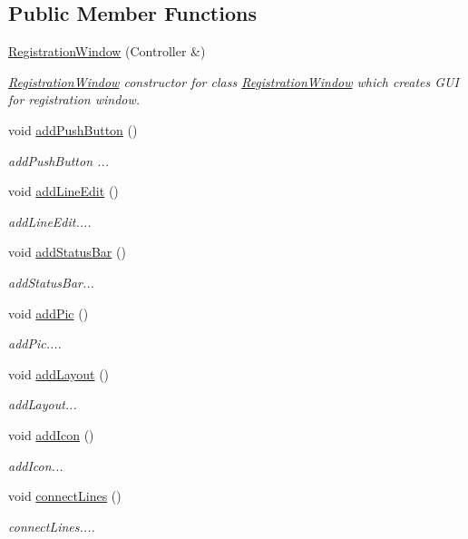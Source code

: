 \subsection*{Public Member Functions}
\begin{DoxyCompactItemize}
\item 
\hyperlink{classRegistrationWindow_ac8876ad29199208fc8b8bd25863c9318}{Registration\+Window} (Controller \&)
\begin{DoxyCompactList}\small\item\em \hyperlink{classRegistrationWindow}{Registration\+Window} constructor for class \hyperlink{classRegistrationWindow}{Registration\+Window} which creates G\+UI for registration window. \end{DoxyCompactList}\item 
void \hyperlink{classRegistrationWindow_a8ae5035dbe91465a32647f8c761ca0a2}{add\+Push\+Button} ()
\begin{DoxyCompactList}\small\item\em add\+Push\+Button ... \end{DoxyCompactList}\item 
void \hyperlink{classRegistrationWindow_a2b4f3c2cc9e9574a236c9a40f8c8fd4c}{add\+Line\+Edit} ()
\begin{DoxyCompactList}\small\item\em add\+Line\+Edit.... \end{DoxyCompactList}\item 
void \hyperlink{classRegistrationWindow_a48b7beed7a7fc741fe706be3de9e6c69}{add\+Status\+Bar} ()
\begin{DoxyCompactList}\small\item\em add\+Status\+Bar... \end{DoxyCompactList}\item 
void \hyperlink{classRegistrationWindow_ad7b9bb0bc0e359c5383b65534b7f0004}{add\+Pic} ()
\begin{DoxyCompactList}\small\item\em add\+Pic.... \end{DoxyCompactList}\item 
void \hyperlink{classRegistrationWindow_ac90214333ddffff0539e9df9bc40eafa}{add\+Layout} ()
\begin{DoxyCompactList}\small\item\em add\+Layout... \end{DoxyCompactList}\item 
void \hyperlink{classRegistrationWindow_a97caee1871c235a06bb91ae0bf2674cf}{add\+Icon} ()
\begin{DoxyCompactList}\small\item\em add\+Icon... \end{DoxyCompactList}\item 
void \hyperlink{classRegistrationWindow_af09a56afbb0978a3e9e04388540a8866}{connect\+Lines} ()
\begin{DoxyCompactList}\small\item\em connect\+Lines.... \end{DoxyCompactList}\end{DoxyCompactItemize}


